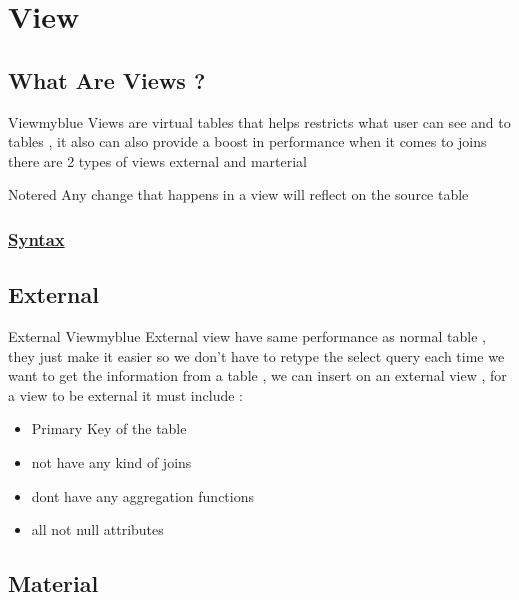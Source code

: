 \section{View}
\subsection{What Are Views ?}

\begin{prettyBox}{View}{myblue}
Views are virtual tables that helps restricts what user can see and to tables , it also
can also provide a boost in performance when it comes to joins there are 2 types of views
external and marterial
\end{prettyBox}

\begin{prettyBox}{Note}{red}
Any change that happens in a view will reflect on the source table
\end{prettyBox}


\subsubsection*{\underline{Syntax}}




\subsection{External}

\begin{prettyBox}{External View}{myblue}
External view have same performance as normal table , they just make it easier
so we don't have to retype the select query each time we want to get the information
from a table , we can insert on an external view , for a view to be external it must include :
\begin{itemize}
    \item Primary Key of the table
    \item not have any kind of joins
    \item dont have any aggregation functions 
    \item all not null attributes
\end{itemize}
\end{prettyBox}

\subsection{Material}

